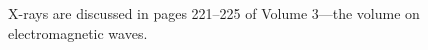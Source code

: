 \documentclass{article}
\begin{document}
  X-rays are discussed in pages 221--225 of Volume 3---the volume on electromagnetic waves.
  
\end{document}
